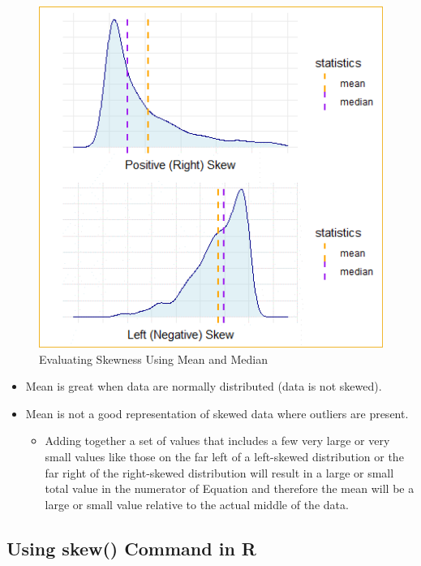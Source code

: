 \documentclass[
  letterpaper,
  DIV=11,
  numbers=noendperiod]{scrreprt}
\providecommand{\tightlist}{%
  \setlength{\itemsep}{0pt}\setlength{\parskip}{0pt}}\usepackage{longtable,booktabs,array}
\begin{document}
\begin{figure}[H]

{\centering \includegraphics{Pictures/Ch2/SkewMeanMedian.png}

}

\caption{Evaluating Skewness Using Mean and Median}

\end{figure}%

\begin{itemize}
\tightlist
\item
  Mean is great when data are normally distributed (data is not skewed).
\item
  Mean is not a good representation of skewed data where outliers are
  present.

  \begin{itemize}
  \tightlist
  \item
    Adding together a set of values that includes a few very large or
    very small values like those on the far left of a left-skewed
    distribution or the far right of the right-skewed distribution will
    result in a large or small total value in the numerator of Equation
    and therefore the mean will be a large or small value relative to
    the actual middle of the data.
  \end{itemize}
\end{itemize}

\subsection{Using skew() Command in R}\label{using-skew-command-in-r}
\end{document}
